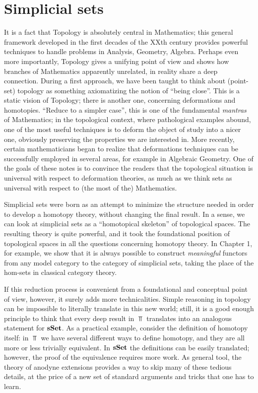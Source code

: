 \chapter{Simplicial sets}

\begin{refsection}

It is a fact that Topology is absolutely central in Mathematics; this general framework developed in the first decades of the XXth century provides powerful techniques to handle problems in Analysis, Geometry, Algebra. Perhaps even more importantly, Topology gives a unifying point of view and shows how branches of Mathematics apparently unrelated, in reality share a deep connection. During a first approach, we have been taught to think about (point-set) topology as something axiomatizing the notion of ``being close''. This is a static vision of Topology; there is another one, concerning deformations and homotopies. ``Reduce to a simpler case'', this is one of the fundamental \emph{mantras} of Mathematics; in the topological context, where pathological examples abound, one of the most useful techniques is to deform the object of study into a nicer one, obviously preserving the properties we are interested in. More recently, certain mathematicians began to realize that deformations techniques can be successfully employed in several areas, for example in Algebraic Geometry. One of the goals of these notes is to convince the readers that the topological situation is universal with respect to deformation theories, as much as we think sets as universal with respect to (the most of the) Mathematics.

Simplicial sets were born as an attempt to minimize the structure needed in order to develop a homotopy theory, without changing the final result. In a sense, we can look at simplicial sets as a ``homotopical skeleton'' of topological spaces. The resulting theory is quite powerful, and it took the foundational position of topological spaces in all the questions concerning homotopy theory. In Chapter 1, for example, we show that it is always possible to construct \emph{meaningful} functors from any model category to the category of simplicial sets, taking the place of the hom-sets in classical category theory.

If this reduction process is convenient from a foundational and conceptual point of view, however, it surely adds more technicalities. Simple reasoning in topology can be impossible to literally translate in this new world; still, it is a good enough principle to think that every deep result in $\Top$ translates into an analogous statement for $\mathbf{sSet}$. As a practical example, consider the definition of homotopy itself: in $\Top$ we have several different ways to define homotopy, and they are all more or less trivially equivalent. In $\mathbf{sSet}$ the definitions can be easily translated; however, the proof of the equivalence requires more work. As general tool, the theory of anodyne extensions provides a way to skip many of these tedious details, at the price of a new set of standard arguments and tricks that one has to learn.


\end{refsection}

